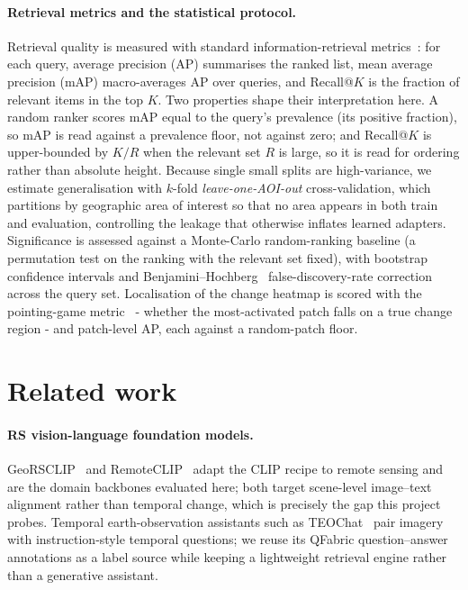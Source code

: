 \documentclass{article}
\begin{document}
\paragraph{Retrieval metrics and the statistical protocol.}
Retrieval quality is measured with standard information-retrieval
metrics~\cite{irmetrics}: for each query, average precision (AP) summarises the
ranked list, mean average precision (mAP) macro-averages AP over queries, and
Recall@$K$ is the fraction of relevant items in the top $K$. Two properties
shape their interpretation here. A random ranker scores mAP equal to the query's
prevalence (its positive fraction), so mAP is read against a prevalence floor,
not against zero; and Recall@$K$ is upper-bounded by $K/R$ when the relevant set
$R$ is large, so it is read for ordering rather than absolute height. Because
single small splits are high-variance, we estimate generalisation with $k$-fold
\emph{leave-one-AOI-out} cross-validation, which partitions by geographic area
of interest so that no area appears in both train and evaluation, controlling
the leakage that otherwise inflates learned adapters. Significance is assessed
against a Monte-Carlo random-ranking baseline (a permutation test on the ranking
with the relevant set fixed), with bootstrap confidence intervals and
Benjamini--Hochberg~\cite{benjaminihochberg} false-discovery-rate correction
across the query set. Localisation of the change heatmap is scored with the
pointing-game metric~\cite{pointinggame} - whether the most-activated patch
falls on a true change region - and patch-level AP, each against a random-patch
floor.


\section{Related work}
\label{sec:related}

\paragraph{RS vision-language foundation models.}
GeoRSCLIP~\cite{georsclip} and RemoteCLIP~\cite{remoteclip} adapt the CLIP recipe
to remote sensing and are the domain backbones evaluated here; both target
scene-level image--text alignment rather than temporal change, which is precisely
the gap this project probes. Temporal earth-observation assistants such as
TEOChat~\cite{teochat} pair imagery with instruction-style temporal questions; we
reuse its QFabric question--answer annotations as a label source while keeping a
lightweight retrieval engine rather than a generative assistant.
\end{document}
